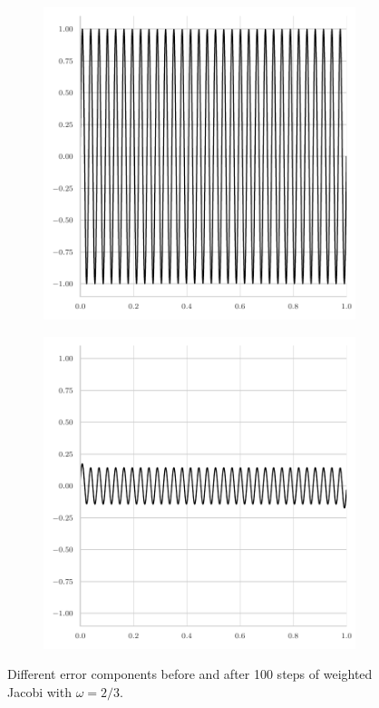 \begin{figure}
\begin{subfigure}[b]{0.45\textwidth}
	\end{subfigure}
	\begin{subfigure}[b]{0.45\textwidth}
		\centering
		\includegraphics[width=\textwidth]{figures/jacobi_initial_error5.pdf}
	\end{subfigure}
	\hfill
	\begin{subfigure}[b]{0.45\textwidth}
		\centering
		\includegraphics[width=\textwidth]{figures/jacobi_final_error5.pdf}
	\end{subfigure}
	\caption{Different error components before and after 100 steps of weighted Jacobi with $\omega = 2/3$.}
	\label{fig:different-error-components-jacobi}
\end{figure}
